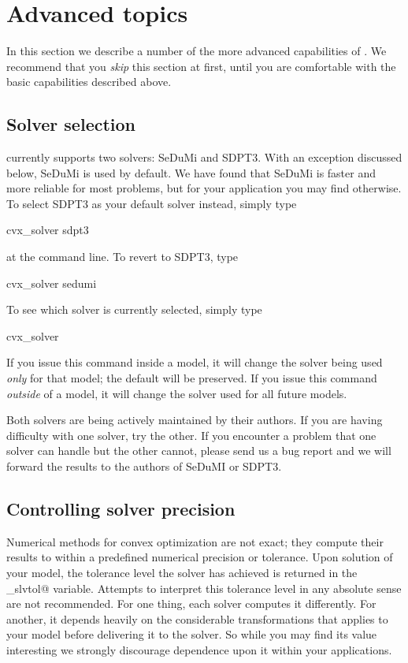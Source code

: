 \documentclass[12pt]{article}
\begin{document}
\newpage
\section{Advanced topics}

In this section we describe a number of the more advanced capabilities of \cvx.
We recommend that you \emph{skip} this section at first, until you are comfortable
with the basic capabilities described above.


\subsection{Solver selection}
\label{sec:solver}

\cvx currently supports two solvers: SeDuMi and SDPT3. With an
exception discussed below, SeDuMi is used by default.
We have found that SeDuMi is faster and more reliable for most 
problems, but for your application you may find otherwise.
To select SDPT3 as your default solver instead, simply type
\begin{code2}
	cvx_solver sdpt3
\end{code2}
at the command line. To revert to SDPT3, type
\begin{code2}
	cvx_solver sedumi
\end{code2}
To see which solver is currently selected, simply type
\begin{code2}
	cvx_solver
\end{code2}
If you issue this command inside a model, it will change the 
solver being used \emph{only} for that model; the default will
be preserved. If you issue this command \emph{outside} of a model,
it will change the solver used for all future models.

Both solvers are being actively maintained by their authors.
If you are having difficulty with one solver, try the other. If you
encounter a problem that one solver can handle but the other cannot, 
please send us a bug report and we will forward the results to
the authors of SeDuMI or SDPT3.

\subsection{Controlling solver precision}
\label{sec:precision}

Numerical methods for convex optimization are not exact; they compute their results
to within a predefined numerical precision or tolerance. Upon solution of your
model, the tolerance level the solver has achieved is returned in the \verb@cvx_slvtol@
variable. Attempts to interpret this tolerance level in any absolute sense are not
recommended. For one thing, each solver computes it differently. For another, it
depends heavily on the considerable transformations that \cvx applies to your 
model before delivering it to the solver.
So while you may find its value interesting we strongly discourage
dependence upon it within your applications.
\end{document}
